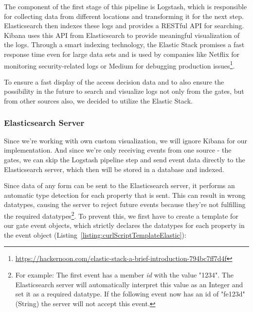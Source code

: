 The component of the first stage of this pipeline is Logstash, which is responsible for collecting data from different locations and transforming it for the next step. Elasticsearch then indexes these logs and provides a RESTful API for searching. Kibana uses this API from Elasticsearch to provide meaningful visualization of the logs.
Through a smart indexing technology, the Elastic Stack promises a fast response time even for large data sets and is used by companies like Netflix for monitoring security-related logs or Medium for debugging production issues\footnote{\url{https://hackernoon.com/elastic-stack-a-brief-introduction-794bc7ff7d4f}}.

To ensure a fast display of the access decision data and to also ensure the possibility in the future to search and visualize logs not only from the gates, but from other sources also, we decided to utilize the Elastic Stack.

\subsubsection{Elasticsearch Server}

Since we're working with own custom visualization, we will ignore Kibana for our implementation. And since we're only receiving events from one source - the gates, we can skip the Logstash pipeline step and send event data directly to the Elasticsearch server, which then will be stored in a database and indexed.

Since data of any form can be sent to the Elasticsearch server, it performs an automatic type detection for each property that is sent. This can result in wrong datatypes, causing the server to reject future events because they're not fulfilling the required datatypes\footnote{For example: The first event has a member \emph{id} with the value "1234". The Elasticsearch server will automatically interpret this value as an Integer and set it as a required datatype. If the following event now has an id of "fe123d" (String) the server will not accept this event.}. To prevent this, we first have to create a template for our gate event objects, which strictly declares the datatypes for each property in the event object (Listing~\ref{listing:curlScriptTemplateElastic}):


